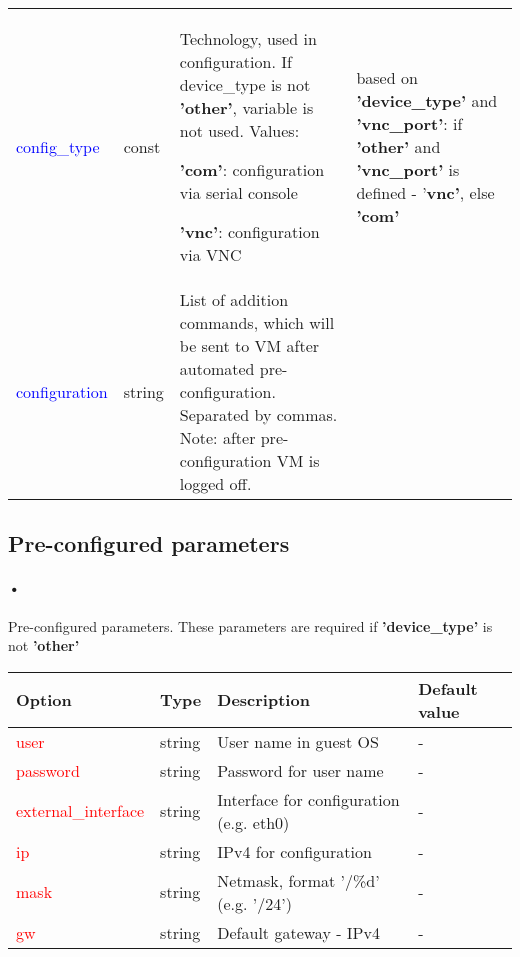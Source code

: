 \documentclass[a4paper,11pt]{article}
\def \frst {2.8cm} %
\def \scnd {1.2cm} %
\def \thrd {8cm}
\def \frth {3cm}
\def \tnamefsrt{\textbf{Option}}
\def \tnamescnd{\textbf{Type}}
\def \tnamethrd{\textbf{Description}}
\def \tnamefrth{\textbf{Default value}}
\let\oldsubsection\subsection
\def\subsection{\subsectionclearpage\let\subsectionclearpage\clearpage\oldsubsection}
\begin{document}
\begin{tabular}{p{\frst}|p{\scnd}|p{\thrd}|p{\frth}}
\textcolor{blue}{config\_type} & const & Technology, used in configuration. If device\_type is not \textbf{'other'}, variable is not used. Values:\par \textbf{'com'}: configuration via serial console\par \textbf{'vnc'}: configuration via VNC & based on \textbf{'device\_type'} and \textbf{'vnc\_port'}: if \textbf{'other'} and \textbf{'vnc\_port'} is defined - '\textbf{vnc'}, else \textbf{'com'} \\
\textcolor{blue}{configuration} & string & List of addition commands, which will be sent to VM after automated pre-configuration. Separated by commas. Note: after pre-configuration VM is logged off. \\
\end{tabular}


\subsection{Pre-configured parameters}
\paragraph{•}
Pre-configured parameters. These parameters are required if \textbf{'device\_type'} is not \textbf{'other'}\\

\begin{tabular}{p{\frst}|p{\scnd}|p{\thrd}|p{\frth}}
\tnamefsrt 		   		   & \tnamescnd   & \tnamethrd           & \tnamefrth 			\\
\hline
\textcolor{red}{user}         & string         & User name in guest OS                      & - \\
\textcolor{red}{password}     & string         & Password for user name                     & - \\
\textcolor{red}{external\_interface} & string  & Interface for configuration (e.g. eth0)    & - \\
\textcolor{red}{ip}           & string         & IPv4 for configuration                     & - \\
\textcolor{red}{mask}         & string         & Netmask, format '/\%d' (e.g. '/24')        & - \\
\textcolor{red}{gw}           & string         & Default gateway - IPv4                     & - \\
\end{tabular}

\end{document}
